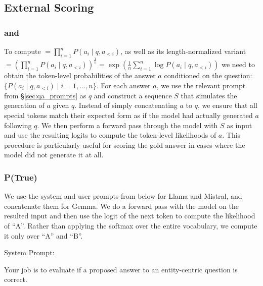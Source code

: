 \subsection{External Scoring}
\label{sec:external_scoring_appendix}

\subsubsection{\texorpdfstring{\baselineA}{Baseline A} and \texorpdfstring{\baselineB}{Baseline B}}
\label{sec:P_appendix}

To compute \baselineA$ = \prod_{i=1}^{n} P(a_i \mid q, a_{<i})$, as well as its length-normalized variant \baselineB$ = \left( \prod_{i=1}^{n} P(a_i \mid q, a_{<i}) \right)^{\frac{1}{n}} = \exp \left( \frac{1}{n} \sum_{i=1}^{n} \log P(a_i \mid q, a_{<i}) \right)$ we need to obtain the token-level probabilities of the answer $a$ conditioned on the question: $\{ P(a_i \mid q, a_{<i}) \mid i = 1, \dots, n \}$. 
For each answer \(a\), we use the relevant prompt from \S \ref{sec:qa_prompts} as \(q\) and construct a sequence \(S\) that simulates the generation of \(a\) given \(q\). Instead of simply concatenating \(a\) to \(q\), we ensure that all special tokens match their expected form as if the model had actually generated \(a\) following \(q\). We then perform a forward pass through the model with \(S\) as input and use the resulting logits to compute the token-level likelihoods of \(a\). 
This procedure is particularly useful for scoring the gold answer in cases where the model did not generate it at all.





\subsubsection{P(True)}
\label{sec:Ptrue_appendix}


We use the system and user prompts from below for Llama and Mistral, and concatenate them for Gemma. We do a forward pass with the model on the resulted input and then use the logit of the next token to compute the likelihood of ``A''. Rather than applying the softmax over the entire vocabulary, we compute it only over ``A'' and ``B''.

System Prompt: 
\begin{mdframed}[backgroundcolor=blue!5, skipabove=0.5\baselineskip]
\small

\noindent Your job is to evaluate if a proposed answer to an entity-centric question is correct.
\end{mdframed}
\vspace{0.5\baselineskip}


